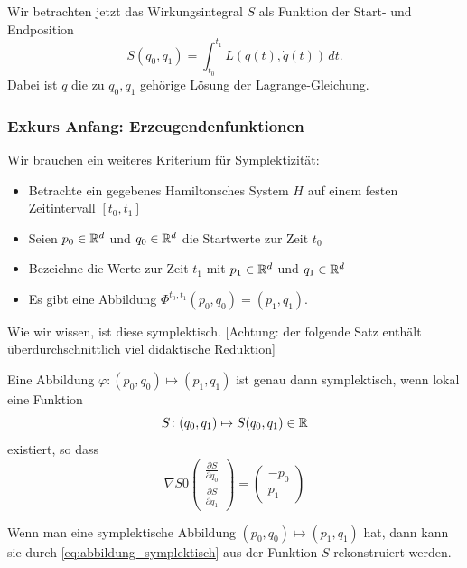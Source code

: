 Wir betrachten jetzt das Wirkungsintegral $S$ als Funktion der Start- und Endposition
\begin{equation*}
	S(q_0,q_1) = \int_{t_0}^{t_1} L(q(t),\dot q(t))\,dt.
\end{equation*}
Dabei ist $q$ die zu $q_0,q_1$ gehörige Lösung der Lagrange-Gleichung.

\subsubsection*{Exkurs Anfang: Erzeugendenfunktionen}

Wir brauchen ein weiteres Kriterium für Symplektizität:
\begin{itemize}
	\item Betrachte ein gegebenes Hamiltonsches System $H$ auf einem festen Zeitintervall $[t_0,t_1]$
	\item Seien $p_0 \in \mathbb R^d$ und $q_0 \in \mathbb R^d$ die Startwerte zur Zeit $t_0$
	\item Bezeichne die Werte zur Zeit $t_1$ mit  $p_1 \in \mathbb R^d$ und $q_1 \in \mathbb R^d$
	\item Es gibt eine Abbildung $\Phi^{t_0,t_1}(p_0,q_0) = (p_1,q_1)$.
\end{itemize}

Wie wir wissen, ist diese symplektisch.
{[Achtung: der folgende Satz enthält überdurchschnittlich viel didaktische Reduktion]}

\begin{satz}
	\label{thm:erzeugendenfunktion}
	Eine Abbildung $\varphi\colon (p_0,q_0) \mapsto (p_1,q_1)$ ist genau dann symplektisch, wenn lokal eine Funktion
	\begin{equation*}
		S\colon (q_0,q_1)\mapsto S(q_0,q_1)\in\mathbb R
	\end{equation*}
	existiert, so dass
	\begin{equation}\label{eq:abbildung_symplektisch}
		\nabla S 0
		\begin{pmatrix}
		\frac{\partial S}{\partial q_0}  \\
		\frac{\partial S}{\partial q_1}
		\end{pmatrix} = \begin{pmatrix}
		-p_0 \\ p_1
		\end{pmatrix}
	\end{equation}
\end{satz}

Wenn man eine symplektische Abbildung $(p_0,q_0)\mapsto(p_1,q_1)$ hat, dann kann sie durch \eqref{eq:abbildung_symplektisch} aus der Funktion $S$ rekonstruiert werden.

